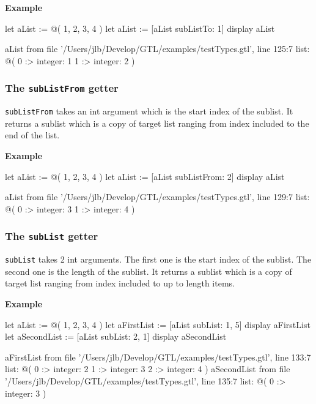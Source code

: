 \documentclass[10pt,openright,twosides,final]{memoir}
\newcommand{\gtlarg}[1]{{\footnotesize\ttfamily\colorbox{light-blue}{#1}}}
\newcommand{\gtlinline}[1]{\colorbox{light-blue}{\lstinline[language=gtl]{#1}}}
\newcommand{\example}{\vspace{.75em}\noindent\textbf{Example}\vspace{0em}}
\begin{document}
\example
\begin{gtl}
let aList := @( 1, 2, 3, 4 )
let aList := [aList subListTo: 1]
display aList
\end{gtl}
\begin{console}
aList from file '/Users/jlb/Develop/GTL/examples/testTypes.gtl', line 125:7
    list: @(
        0 :>
            integer: 1
        1 :>
            integer: 2
    )
\end{console}

\subsubsection{The \texttt{subListFrom} getter}

\gtlinline{subListFrom} takes an int argument which is the start \gtlarg{index} of the sublist. It returns a sublist which is a copy of target list ranging from \gtlarg{index} included to the end of the list. 

\example
\begin{gtl}
let aList := @( 1, 2, 3, 4 )
let aList := [aList subListFrom: 2]
display aList
\end{gtl}
\begin{console}
aList from file '/Users/jlb/Develop/GTL/examples/testTypes.gtl', line 129:7
    list: @(
        0 :>
            integer: 3
        1 :>
            integer: 4
    )
\end{console}

\subsubsection{The \texttt{subList} getter}

\gtlinline{subList} takes 2 int arguments. The first one is the start \gtlarg{index} of the sublist. The second one is the \gtlarg{length} of the sublist. It returns a sublist which is a copy of target list ranging from \gtlarg{index} included to up to \gtlarg{length} items.

\example
\begin{gtl}
let aList := @( 1, 2, 3, 4 )
let aFirstList := [aList subList: 1, 5]
display aFirstList
let aSecondList := [aList subList: 2, 1]
display aSecondList
\end{gtl}
\begin{console}
aFirstList from file '/Users/jlb/Develop/GTL/examples/testTypes.gtl', line 133:7
    list: @(
        0 :>
            integer: 2
        1 :>
            integer: 3
        2 :>
            integer: 4
    )
aSecondList from file '/Users/jlb/Develop/GTL/examples/testTypes.gtl', line 135:7
    list: @(
        0 :>
            integer: 3
    )
\end{console}
\end{document}
